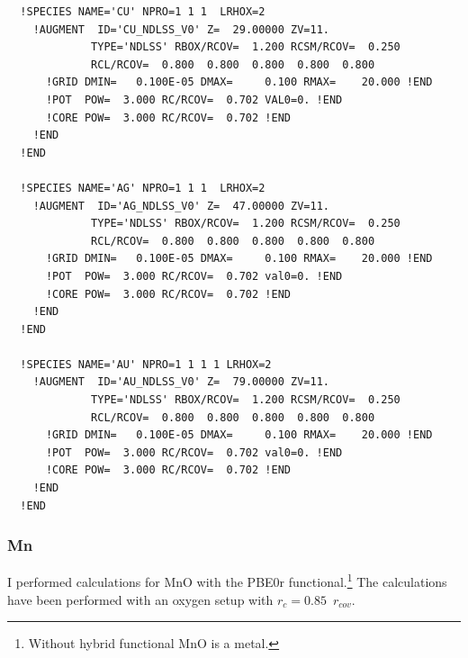 \documentclass[11pt,a4paper]{report}
\begin{document}
\begin{verbatim}
  !SPECIES NAME='CU' NPRO=1 1 1  LRHOX=2 
    !AUGMENT  ID='CU_NDLSS_V0' Z=  29.00000 ZV=11.
             TYPE='NDLSS' RBOX/RCOV=  1.200 RCSM/RCOV=  0.250
             RCL/RCOV=  0.800  0.800  0.800  0.800  0.800
      !GRID DMIN=   0.100E-05 DMAX=     0.100 RMAX=    20.000 !END
      !POT  POW=  3.000 RC/RCOV=  0.702 VAL0=0. !END
      !CORE POW=  3.000 RC/RCOV=  0.702 !END
    !END
  !END

  !SPECIES NAME='AG' NPRO=1 1 1  LRHOX=2 
    !AUGMENT  ID='AG_NDLSS_V0' Z=  47.00000 ZV=11.
             TYPE='NDLSS' RBOX/RCOV=  1.200 RCSM/RCOV=  0.250
             RCL/RCOV=  0.800  0.800  0.800  0.800  0.800
      !GRID DMIN=   0.100E-05 DMAX=     0.100 RMAX=    20.000 !END
      !POT  POW=  3.000 RC/RCOV=  0.702 val0=0. !END
      !CORE POW=  3.000 RC/RCOV=  0.702 !END
    !END
  !END

  !SPECIES NAME='AU' NPRO=1 1 1 1 LRHOX=2 
    !AUGMENT  ID='AU_NDLSS_V0' Z=  79.00000 ZV=11.
             TYPE='NDLSS' RBOX/RCOV=  1.200 RCSM/RCOV=  0.250
             RCL/RCOV=  0.800  0.800  0.800  0.800  0.800
      !GRID DMIN=   0.100E-05 DMAX=     0.100 RMAX=    20.000 !END
      !POT  POW=  3.000 RC/RCOV=  0.702 val0=0. !END
      !CORE POW=  3.000 RC/RCOV=  0.702 !END
    !END
  !END
\end{verbatim}



\subsubsection{Mn}
I performed calculations for MnO with the PBE0r
functional.\footnote{Without hybrid functional MnO is a metal.}  The
calculations have been performed with an oxygen setup with
$r_c=0.85$~$r_{cov}$. 
\end{document}
